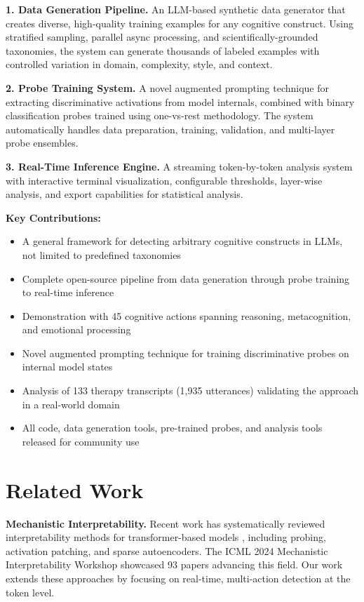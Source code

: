 \documentclass[letterpaper]{article}
\begin{document}
\textbf{1. Data Generation Pipeline.} An LLM-based synthetic data generator that creates diverse, high-quality training examples for any cognitive construct. Using stratified sampling, parallel async processing, and scientifically-grounded taxonomies, the system can generate thousands of labeled examples with controlled variation in domain, complexity, style, and context.

\textbf{2. Probe Training System.} A novel augmented prompting technique for extracting discriminative activations from model internals, combined with binary classification probes trained using one-vs-rest methodology. The system automatically handles data preparation, training, validation, and multi-layer probe ensembles.

\textbf{3. Real-Time Inference Engine.} A streaming token-by-token analysis system with interactive terminal visualization, configurable thresholds, layer-wise analysis, and export capabilities for statistical analysis.

\textbf{Key Contributions:}
\begin{itemize}
\item A general framework for detecting arbitrary cognitive constructs in LLMs, not limited to predefined taxonomies
\item Complete open-source pipeline from data generation through probe training to real-time inference
\item Demonstration with 45 cognitive actions spanning reasoning, metacognition, and emotional processing
\item Novel augmented prompting technique for training discriminative probes on internal model states
\item Analysis of 133 therapy transcripts (1,935 utterances) validating the approach in a real-world domain
\item All code, data generation tools, pre-trained probes, and analysis tools released for community use
\end{itemize}

\section{Related Work}

\textbf{Mechanistic Interpretability.} Recent work has systematically reviewed interpretability methods for transformer-based models \cite{rai2025mechanistic}, including probing, activation patching, and sparse autoencoders. The ICML 2024 Mechanistic Interpretability Workshop showcased 93 papers advancing this field. Our work extends these approaches by focusing on real-time, multi-action detection at the token level.
\end{document}
